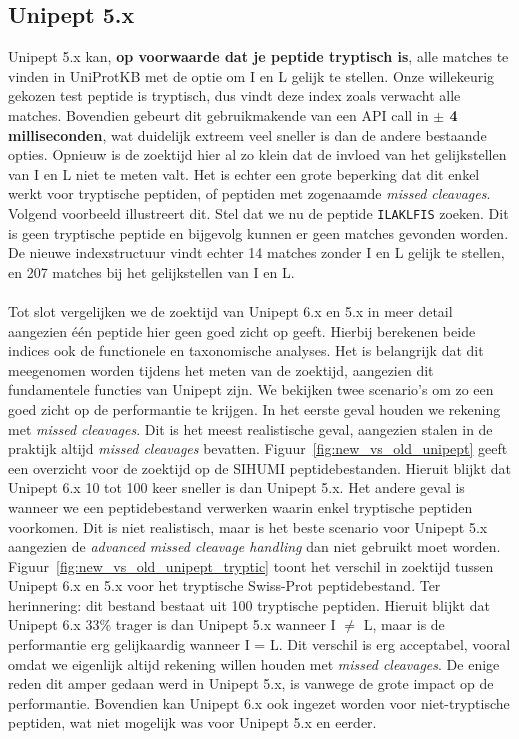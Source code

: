 \subsection{Unipept 5.x}
Unipept 5.x kan, \textbf{op voorwaarde dat je peptide tryptisch is}, alle matches te vinden in UniProtKB met de optie om I en L gelijk te stellen.
Onze willekeurig gekozen test peptide is tryptisch, dus vindt deze index zoals verwacht alle matches.
Bovendien gebeurt dit gebruikmakende van een API call in \textbf{$\pm$ 4 milliseconden}, wat duidelijk extreem veel sneller is dan de andere bestaande opties.
Opnieuw is de zoektijd hier al zo klein dat de invloed van het gelijkstellen van I en L niet te meten valt.
Het is echter een grote beperking dat dit enkel werkt voor tryptische peptiden, of peptiden met zogenaamde \textit{missed cleavages}.
Volgend voorbeeld illustreert dit.
Stel dat we nu de peptide \texttt{ILAKLFIS} zoeken.
Dit is geen tryptische peptide en bijgevolg kunnen er geen matches gevonden worden.
De nieuwe indexstructuur vindt echter 14 matches zonder I en L gelijk te stellen, en 207 matches bij het gelijkstellen van I en L\@.
\\ \\
Tot slot vergelijken we de zoektijd van Unipept 6.x en 5.x in meer detail aangezien één peptide hier geen goed zicht op geeft.
Hierbij berekenen beide indices ook de functionele en taxonomische analyses.
Het is belangrijk dat dit meegenomen worden tijdens het meten van de zoektijd, aangezien dit fundamentele functies van Unipept zijn.
We bekijken twee scenario's om zo een goed zicht op de performantie te krijgen.
In het eerste geval houden we rekening met \textit{missed cleavages}.
Dit is het meest realistische geval, aangezien stalen in de praktijk altijd \textit{missed cleavages} bevatten.
Figuur~\ref{fig:new_vs_old_unipept} geeft een overzicht voor de zoektijd op de SIHUMI peptidebestanden.
Hieruit blijkt dat Unipept 6.x 10 tot 100 keer sneller is dan Unipept 5.x.
Het andere geval is wanneer we een peptidebestand verwerken waarin enkel tryptische peptiden voorkomen.
Dit is niet realistisch, maar is het beste scenario voor Unipept 5.x aangezien de \textit{advanced missed cleavage handling} dan niet gebruikt moet worden.
Figuur~\ref{fig:new_vs_old_unipept_tryptic} toont het verschil in zoektijd tussen Unipept 6.x en 5.x voor het tryptische Swiss-Prot peptidebestand.
Ter herinnering: dit bestand bestaat uit 100 tryptische peptiden.
Hieruit blijkt dat Unipept 6.x 33\% trager is dan Unipept 5.x wanneer I $\neq$ L, maar is de performantie erg gelijkaardig wanneer I = L\@.
Dit verschil is erg acceptabel, vooral omdat we eigenlijk altijd rekening willen houden met \textit{missed cleavages}.
De enige reden dit amper gedaan werd in Unipept 5.x, is vanwege de grote impact op de performantie.
Bovendien kan Unipept 6.x ook ingezet worden voor niet-tryptische peptiden, wat niet mogelijk was voor Unipept 5.x en eerder.

